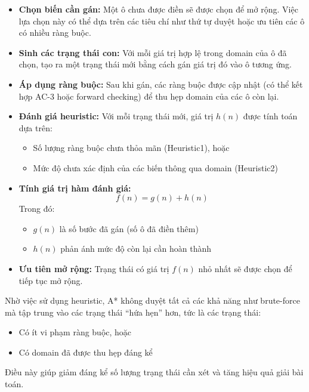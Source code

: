 \begin{itemize}
    \item \textbf{Chọn biến cần gán:} 
    Một ô chưa được điền sẽ được chọn để mở rộng. Việc lựa chọn này có thể dựa trên các tiêu chí như thứ tự duyệt hoặc ưu tiên các ô có nhiều ràng buộc.

    \item \textbf{Sinh các trạng thái con:}
    Với mỗi giá trị hợp lệ trong domain của ô đã chọn, tạo ra một trạng thái mới bằng cách gán giá trị đó vào ô tương ứng.

    \item \textbf{Áp dụng ràng buộc:}
    Sau khi gán, các ràng buộc được cập nhật (có thể kết hợp AC-3 hoặc forward checking) để thu hẹp domain của các ô còn lại.

    \item \textbf{Đánh giá heuristic:}
    Với mỗi trạng thái mới, giá trị $h(n)$ được tính toán dựa trên:
    \begin{itemize}
        \item Số lượng ràng buộc chưa thỏa mãn (Heuristic1), hoặc
        \item Mức độ chưa xác định của các biến thông qua domain (Heuristic2)
    \end{itemize}

    \item \textbf{Tính giá trị hàm đánh giá:}
    \[
    f(n) = g(n) + h(n)
    \]
    Trong đó:
    \begin{itemize}
        \item $g(n)$ là số bước đã gán (số ô đã điền thêm)
        \item $h(n)$ phản ánh mức độ còn lại cần hoàn thành
    \end{itemize}

    \item \textbf{Ưu tiên mở rộng:}
    Trạng thái có giá trị $f(n)$ nhỏ nhất sẽ được chọn để tiếp tục mở rộng.
\end{itemize}

Nhờ việc sử dụng heuristic, A* không duyệt tất cả các khả năng như brute-force mà tập trung vào các trạng thái “hứa hẹn” hơn, tức là các trạng thái:
\begin{itemize}
    \item Có ít vi phạm ràng buộc, hoặc
    \item Có domain đã được thu hẹp đáng kể
\end{itemize}

Điều này giúp giảm đáng kể số lượng trạng thái cần xét và tăng hiệu quả giải bài toán.
